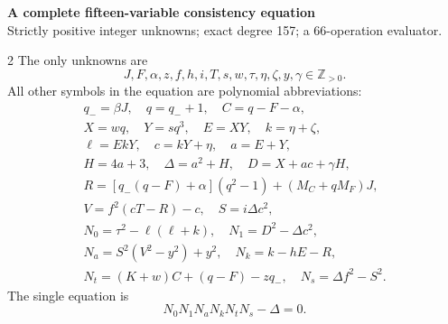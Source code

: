 \documentclass[10pt]{article}
\begin{document}
\begin{center}
{\large\bfseries A complete fifteen-variable consistency equation}\\[-1pt]
{\small Strictly positive integer unknowns; exact degree 157; a 66-operation evaluator.}
\end{center}\vspace{-8pt}
\begin{multicols}{2}
\fontsize{9}{9.5}\selectfont
The only unknowns are
\[
J,F,\alpha,z,f,h,i,T,s,w,\tau,\eta,\zeta,y,\gamma\in\mathbb Z_{>0}.
\]
All other symbols in the equation are polynomial abbreviations:
\[
\begin{gathered}
q_-=\beta J,\quad q=q_-+1,\quad C=q-F-\alpha,\\
X=wq,\quad Y=sq^3,\quad E=XY,\quad k=\eta+\zeta,\\
\ell=EkY,\quad c=kY+\eta,\quad a=E+Y,\\
H=4a+3,\quad\Delta=a^2+H,\quad D=X+ac+\gamma H,\\
R=[q_-(q-F)+\alpha](q^2-1)+(M_C+qM_F)J,\\
V=f^2(cT-R)-c,\quad S=i\Delta c^2,\\
N_0=\tau^2-\ell(\ell+k),\quad N_1=D^2-\Delta c^2,\\
N_a=S^2(V^2-y^2)+y^2,\quad N_k=k-hE-R,\\
N_t=(K+w)C+(q-F)-zq_-,\quad N_s=\Delta f^2-S^2.
\end{gathered}
\]
The single equation is
\[
\boxed{N_0N_1N_aN_kN_tN_s-\Delta=0.}
\]


\end{multicols}
\end{document}

